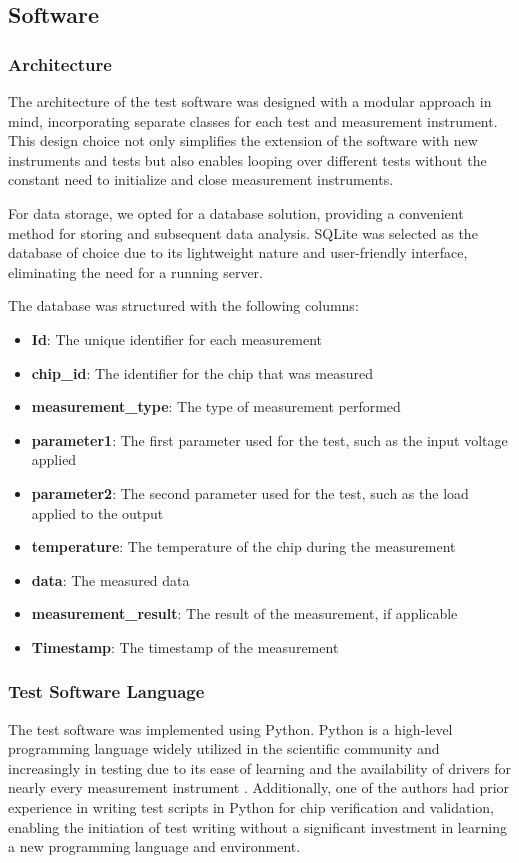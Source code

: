 

\subsection{Software}

\subsubsection{Architecture}
The architecture of the test software was designed with a modular approach in mind, incorporating separate classes for each test and measurement instrument. This design choice not only simplifies the extension of the software with new instruments and tests but also enables looping over different tests without the constant need to initialize and close measurement instruments.

For data storage, we opted for a database solution, providing a convenient method for storing and subsequent data analysis. SQLite was selected as the database of choice due to its lightweight nature and user-friendly interface, eliminating the need for a running server.

The database was structured with the following columns:
\begin{itemize}
    \item \textbf{Id}: The unique identifier for each measurement
    \item \textbf{chip\_id}: The identifier for the chip that was measured
    \item \textbf{measurement\_type}: The type of measurement performed
    \item \textbf{parameter1}: The first parameter used for the test, such as the input voltage applied
    \item \textbf{parameter2}: The second parameter used for the test, such as the load applied to the output
    \item \textbf{temperature}: The temperature of the chip during the measurement
    \item \textbf{data}: The measured data
    \item \textbf{measurement\_result}: The result of the measurement, if applicable
    \item \textbf{Timestamp}: The timestamp of the measurement
\end{itemize}

\subsubsection{Test Software Language}
The test software was implemented using Python. Python is a high-level programming language widely utilized in the scientific community and increasingly in testing due to its ease of learning and the availability of drivers for nearly every measurement instrument \cite{Wikipedia:Python}. Additionally, one of the authors had prior experience in writing test scripts in Python for chip verification and validation, enabling the initiation of test writing without a significant investment in learning a new programming language and environment.

